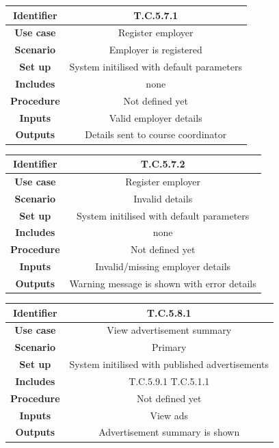 \documentclass{l3deliverable}
\begin{document}
\begin{tabular}{|c|c|}
\hline \textbf{Identifier} & T.C.5.7.1\\
\hline \textbf{Use case} & Register employer\\
\hline \textbf{Scenario} & Employer is registered\\
\hline \textbf{Set up} & System initilised with default parameters\\
\hline \textbf{Includes} & none\\
\hline \textbf{Procedure} & Not defined yet\\
\hline \textbf{Inputs} & Valid employer details\\
\hline \textbf{Outputs} & Details sent to course coordinator\\
\hline
\end{tabular}

\begin{tabular}{|c|c|}
\hline \textbf{Identifier} & T.C.5.7.2\\
\hline \textbf{Use case} & Register employer\\
\hline \textbf{Scenario} & Invalid details\\
\hline \textbf{Set up} & System initilised with default parameters\\
\hline \textbf{Includes} & none\\
\hline \textbf{Procedure} & Not defined yet\\
\hline \textbf{Inputs} & Invalid/missing employer details\\
\hline \textbf{Outputs} & Warning message is shown with error details\\
\hline
\end{tabular}

\begin{tabular}{|c|c|}
\hline \textbf{Identifier} & T.C.5.8.1\\
\hline \textbf{Use case} & View advertisement summary\\
\hline \textbf{Scenario} & Primary\\
\hline \textbf{Set up} & System initilised with published advertisements\\
\hline \textbf{Includes} & T.C.5.9.1 T.C.5.1.1\\
\hline \textbf{Procedure} & Not defined yet\\
\hline \textbf{Inputs} & View ads\\
\hline \textbf{Outputs} & Advertisement summary is shown\\
\hline
\end{tabular}
\end{document}
